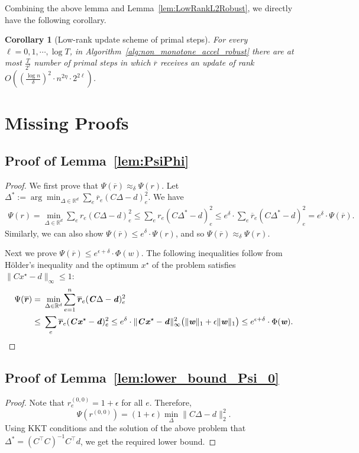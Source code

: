 \documentclass[11pt]{article}
\newtheorem{corollary}[theorem]{Corollary}
\newcommand\rea{\mathbb{R}}
\let\originalleft\left
\let\originalright\right
\renewcommand{\left}{\mathopen{}\mathclose\bgroup\originalleft}
\renewcommand{\right}{\aftergroup\egroup\originalright}
\newcommand\dd{\boldsymbol{\mathit{d}}}
\newcommand\rr{\boldsymbol{\mathit{r}}}
\newcommand\ww{\boldsymbol{\mathit{w}}}
\newcommand\xx{\boldsymbol{\mathit{x}}}
\newcommand\rrbar{\overline{\boldsymbol{\mathit{r}}}}
\newcommand\CC{\boldsymbol{\mathit{C}}}
\newcommand{\ov}{\overline}
\begin{document}
Combining the above lemma and Lemma~\ref{lem:LowRankL2Robust}, we directly have the following corollary.
\begin{corollary}[Low-rank update scheme of primal steps]
For every $\ell = 0,1, \cdots, \log T$, in Algorithm~\ref{alg:non_monotone_accel_robust} there are at most $\frac{T}{2^{\ell}}$ number of primal steps in which $\ov{\rr}$ receives an update of rank $O((\frac{\log n}{\delta})^2 \cdot n^{2 \eta} \cdot 2^{2\ell})$.
\end{corollary} \section{Missing Proofs}\label{sec:missing_proofs}
\subsection*{Proof of Lemma~\ref{lem:PsiPhi}} 
\begin{proof}
We first prove that $\Psi(\rrbar) \approx_{\delta} \Psi(\rr)$. Let $\Delta^* := \arg \min_{\Delta\in \rea^d }\sum_e \rrbar_e (\CC\Delta-\dd)^2_e$. We have
\begin{align*}
\Psi(\rr) = \min_{\Delta\in \rea^d } \sum_e \rr_e (\CC\Delta-\dd)^2_e \leq \sum_e \rr_e (\CC\Delta^*-\dd)^2_e \leq e^{\delta} \cdot \sum_e \rrbar_e (\CC\Delta^*-\dd)^2_e = e^{\delta} \cdot  \Psi(\rrbar).
\end{align*}
Similarly, we can also show $\Psi(\rrbar) \leq e^{\delta} \cdot \Psi(\rr)$, and so $\Psi(\rrbar) \approx_{\delta} \Psi(\rr)$.

Next we prove $\Psi(\rrbar) \leq e^{\epsilon+\delta} \cdot \Phi(\ww)$. The following inequalities follow from Hölder's inequality and the optimum $\xx^{\star}$ of the problem satisfies $\|\CC\xx^{\star}-\dd\|_{\infty}\leq 1$:
\begin{align*}
\Psi(\rrbar) = &~ \min_{\Delta\in \rea^d} \sum_{e=1}^n\rrbar_e(\CC\Delta-\dd)_e^2 \\
\leq &~ \sum_e\rrbar_e(\CC\xx^{\star}-\dd)_e^2
 \leq e^{\delta} \cdot \|\CC\xx^{\star}-\dd\|^2_{\infty}\left(\|\ww\|_1 + \epsilon \|\ww\|_1\right)\leq e^{\epsilon + \delta} \cdot \Phi(\ww). \qedhere
\end{align*}
\end{proof}

\subsection*{Proof of Lemma~\ref{lem:lower_bound_Psi_0}} 
\begin{proof}
Note that $\rr_e^{(0,0)} = 1+\epsilon$ for all $e$. Therefore,
\[
\Psi(\rr^{(0,0)}) = (1+\epsilon)\min_{\Delta}\|\CC\Delta-\dd\|_2^2.
\]
Using KKT conditions and the solution of the above problem that $\Delta^* = (\CC^{\top} \CC)^{-1} \CC^{\top} \dd$, we get the required lower bound.
\end{proof}
\end{document}
